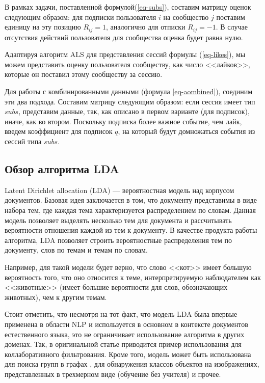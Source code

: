 \documentclass[times,specification,annotation]{itmo-student-thesis}
\begin{document}
В рамках задачи, поставленной формулой(\ref{eq-subs}), составим матрицу оценок следующим образом: для подписки пользователя $i$ на сообщество $j$ поставим единицу на эту позицию $R_{ij} = 1$, аналогично для отписки $R_{ij} = - 1$. В случае отсутствия действий пользователя для сообщества оценка будет равна нулю.

Адаптируя алгоритм ALS для представления сессий формулы (\ref{eq-likes}), мы можем представить оценку пользователя сообществу, как число <<лайков>>, которые он поставил этому сообществу за сессию.

Для работы с комбинированными данными (формула \ref{eq-aombined}), соединим эти два подхода. Составим матрицу следующим образом: если сессия имеет тип $subs$, представим данные, так, как описано в первом варианте (для подписок), иначе, как во втором. Поскольку подписка более важное событие, чем лайк, введем коэффициент для подписок $q$, на который будут домножаться события из сессий типа $subs$.   


\subsection{Обзор алгоритма LDA}\label{sec:lda}

Latent Dirichlet allocation (LDA) \cite{lda2003} --- вероятностная модель над корпусом документов. Базовая идея заключается в том, что документу представимы в виде набора тем, где каждая тема характеризуется распределением по словам. Данная модель позволяет выделять несколько тем для документа и рассчитывать вероятности отношения каждой из тем к документу.
В качестве продукта работы алгоритма, LDA позволяет строить вероятностные распределения тем по документу, слов по темам и темам по словам.

Например, для такой модели будет верно, что слово <<кот>> имеет большую вероятность того, что оно относится к теме, интерпретируемую наблюдателем как <<животные>> (имеет большие вероятности для слов, обозначающих животных), чем к другим темам. 

Стоит отметить, что несмотря на тот факт, что модель LDA была впервые применена в области NLP и используется в основном в контексте документов естественного языка, это не ограничивает использование алгоритма в других доменах. Так, в оригинальной статье \cite{lda2003} приводится пример использования для коллаборативного фильтрования. Кроме того, модель может быть использована для поиска групп в графах \cite{Henderson2009}, для обнаружения классов объектов на изображениях, представленных в трехмерном виде (обучение без учителя) \cite{Endres2009} и прочее.
\end{document}
